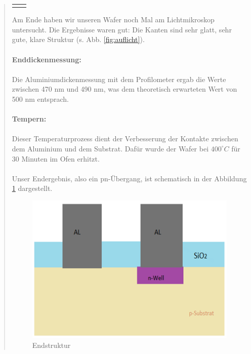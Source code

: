 \begin{quote}
\begin{center}
\begin{tabular}{ll}
\begin{minipage}{0.5\textwidth}
                    \end{minipage}

                \end{tabular}
			\end{center}

    		\vspace{2em}

    		Am Ende haben wir unseren Wafer noch Mal am Lichtmikroskop
    		untersucht. Die Ergebnisse waren gut: Die Kanten sind sehr glatt,
    		sehr gute, klare Struktur (s. Abb. \ref{fig:auflicht}).\\
			\\
			\textbf{Enddickenmessung:}\\
			\\
			Die Aluminiumdickenmessung mit dem Profilometer ergab die Werte
			zwischen 470 nm und 490 nm, was dem theoretisch erwarteten Wert von
			500 nm entsprach.\\
			\\
			\textbf{Tempern:}\\
			\\
			Dieser Temperaturprozess dient der Verbesserung der Kontakte
			zwischen dem Aluminium und dem Substrat. Dafür wurde der Wafer bei
			$400^{\circ}C$ für 30 Minuten im Ofen erhitzt.\\
			\\
			Unser Endergebnis, also ein pn-Übergang, ist schematisch  in der
			Abbildung \ref{fig:end} dargestellt.

    		\vspace{2em}

    		\begin{figure}[H]
				\hspace{2.5 cm}
                  \includegraphics[scale=1, trim = 0cm 0cm 0cm 0cm,clip]
                	{./HerstellungBilder/Endstruktur.png}
                  \caption{Endstruktur}
                \label{fig:end}
            \end{figure}


\end{quote}
